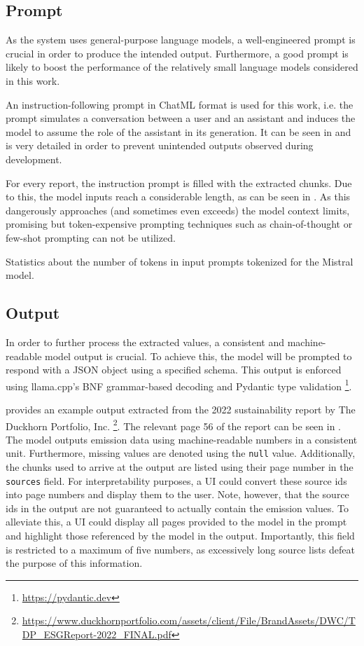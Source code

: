 \documentclass[]{article}
\begin{document}
\subsection{Prompt}
\label{subsec:prompt}
As the system uses general-purpose language models, a well-engineered prompt is crucial in order to produce the intended output. Furthermore, a good prompt is likely to boost the performance of the relatively small language models considered in this work.

An instruction-following prompt in ChatML format is used for this work, i.e. the prompt simulates a conversation between a user and an assistant and induces the model to assume the role of the assistant in its generation. It can be seen in  and is very detailed in order to prevent unintended outputs observed during development.

For every report, the instruction prompt is filled with the extracted chunks. Due to this, the model inputs reach a considerable length, as can be seen in . As this dangerously approaches (and sometimes even exceeds) the model context limits, promising but token-expensive prompting techniques such as chain-of-thought \cite{DBLP:conf/nips/Wei0SBIXCLZ22} or few-shot \cite{DBLP:conf/nips/BrownMRSKDNSSAA20} prompting can not be utilized.

\begin{table}[h]
	
	\caption{Statistics about the number of tokens in input prompts tokenized for the Mistral model.}
	\label{tab:token}
\end{table}


\subsection{Output}
In order to further process the extracted values, a consistent and machine-readable model output is crucial. To achieve this, the model will be prompted to respond with a JSON object using a specified schema. This output is enforced using llama.cpp's BNF grammar-based decoding and Pydantic type validation \footnote{\url{https://pydantic.dev}}.

 provides an example output extracted from the 2022 sustainability report by The Duckhorn Portfolio, Inc. \footnote{\url{https://www.duckhornportfolio.com/assets/client/File/BrandAssets/DWC/TDP_ESGReport-2022_FINAL.pdf}}. The relevant page 56 of the report can be seen in . The model outputs emission data using machine-readable numbers in a consistent unit. Furthermore, missing values are denoted using the \texttt{null} value. Additionally, the chunks used to arrive at the output are listed using their page number in the \texttt{sources} field. For interpretability purposes, a UI could convert these source ids into page numbers and display them to the user. Note, however, that the source ids in the output are not guaranteed to actually contain the emission values. To alleviate this, a UI could display all pages provided to the model in the prompt and highlight those referenced by the model in the output. Importantly, this field is restricted to a maximum of five numbers, as excessively long source lists defeat the purpose of this information.
\end{document}
